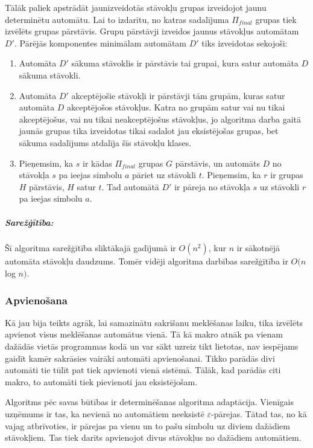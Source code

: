 Tālāk paliek apstrādāt jaunizveidotās stāvokļu grupas izveidojot jaunu determinētu automātu. Lai to izdarītu, no katras sadalījuma $\Pi_{final}$ grupas tiek izvēlēts grupas pārstāvis. Grupu pārstāvji izveidos jaunus stāvokļus automātam $D'$. Pārējās komponentes minimālam automātam $D'$ tiks izveidotas sekojoši:
\begin{enumerate}
\item Automāta $D'$ sākuma stāvoklis ir pārstāvis tai grupai, kura satur automāta $D$ sākuma stāvokli.
\item Automāta $D'$ akceptējošie stāvokļi ir pārstāvji tām grupām, kuras satur automāta $D$ akceptējošos stāvokļus. Katra no grupām satur vai nu tikai akceptējošus, vai nu tikai neakceptējošus stāvokļus, jo algoritma darba gaitā jaunās grupas tika izveidotas tikai sadalot jau eksistējošas grupas, bet sākuma sadalījums atdalīja šīs stāvokļu klases.
\item Pieņemsim, ka $s$ ir kādas $\Pi_{final}$ grupas $G$ pārstāvis, un automāts $D$ no stāvokļa $s$ pa ieejas simbolu $a$ pāriet uz stāvokli $t$. Pieņemsim, ka $r$ ir grupas $H$ pārstāvis, $H$ satur $t$. Tad automātā $D'$ ir pāreja no stāvokļa $s$ uz stāvokli $r$ pa ieejas simbolu $a$.
\end{enumerate}

\subparagraph{Sarežģītība:}
Šī algoritma sarežģītība sliktākajā gadījumā ir $O(n^2)$, kur $n$ ir sākotnējā automāta stāvokļu daudzums. Tomēr vidēji algoritma darbības sarežģītība ir $O(n$ log $n)$. \cite{Bassino:ComplexityMinimization}

\subsubsection{Apvienošana}

Kā jau bija teikts agrāk, lai samazinātu sakrišanu meklēšanas laiku, tika izvēlēts apvienot visus meklēšanas automātus vienā. Tā kā makro atnāk pa vienam dažādās vietās programmas kodā un var sākt uzreiz tikt lietotas, nav iespējams gaidīt kamēr sakrāsies vairāki automāti apvienošanai. Tikko parādās divi automāti tie tūlīt pat tiek apvienoti vienā sistēmā. Tālāk, kad parādās citi makro, to automāti tiek pievienoti jau eksistējošam.

Algoritms pēc savas būtības ir determinēšanas algoritma adaptācija. Vienīgais uzņēmums ir tas, ka nevienā no automātiem neeksistē $\varepsilon$-pārejas. Tātad tas, no kā vajag atbrīvoties, ir pārejas pa vienu un to pašu simbolu uz diviem dažādiem stāvokļiem. Tas tiek darīts apvienojot divus stāvokļus no dažādiem automātiem. 

